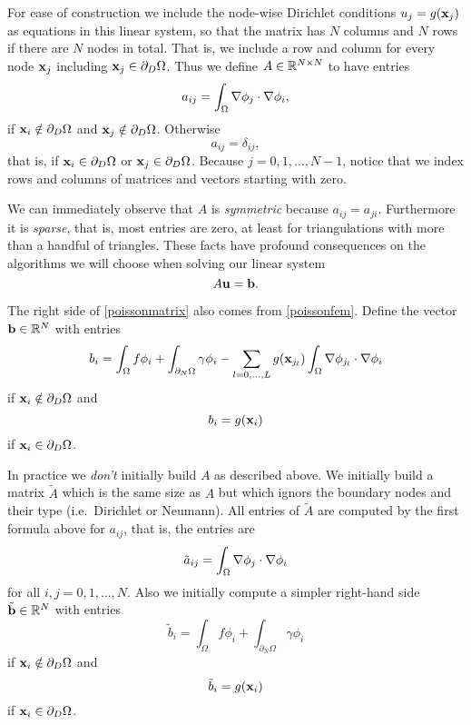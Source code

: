 For ease of construction we include the node-wise Dirichlet conditions $u_j=g(\mathbf{x}_j)$ as equations in this linear system, so that the matrix has $N$ columns and $N$ rows if there are $N$ nodes in total.  That is, we include a row and column for every node $\mathbf{x}_j$ including $\mathbf{x}_j\in\partial_D\Omega$.  Thus we define $A \in \mathbb{R}^{N\times N}$ to have entries
\begin{equation*}
a_{ij} = \int_\Omega \nabla \phi_j \cdot \nabla \phi_i,
\end{equation*}
if $\mathbf{x}_i \notin \partial_D \Omega$ and $\mathbf{x}_j \notin \partial_D \Omega$.  Otherwise
\begin{equation*}
a_{ij} = \delta_{ij},
\end{equation*}
that is, if $\mathbf{x}_i \in \partial_D \Omega$ or $\mathbf{x}_j \in \partial_D \Omega$.  Because $j=0,1,\dots,N-1$, notice that we index rows and columns of matrices and vectors starting with zero.

We can immediately observe that $A$ is \emph{symmetric} because $a_{ij}=a_{ji}$.  Furthermore it is \emph{sparse}, that is, most entries are zero, at least for triangulations with more than a handful of triangles.  These facts have profound consequences on the algorithms we will choose when solving our linear system
\begin{equation}
A \mathbf{u} = \mathbf{b}. \label{poissonmatrix}
\end{equation}

The right side of \eqref{poissonmatrix} also comes from \eqref{poissonfem}.  Define the vector $\mathbf{b}\in\mathbb{R}^N$ with entries
    $$b_i = \int_\Omega f \phi_i + \int_{\partial_N\Omega} \gamma \phi_i - \sum_{l=0,\dots,L} g(\mathbf{x}_{j_l})  \int_\Omega \nabla \phi_{j_l} \cdot \nabla \phi_i$$
if $\mathbf{x}_i \notin \partial_D \Omega$ and
    $$b_i = g(\mathbf{x}_{i})$$
if $\mathbf{x}_i \in \partial_D \Omega$.

In practice we \emph{don't} initially build $A$ as described above.  We initially build a matrix $\tilde A$ which is the same size as $A$ but which ignors the boundary nodes and their type (i.e.~Dirichlet or Neumann).  All entries of $\tilde A$ are computed by the first formula above for $a_{ij}$, that is, the entries are
\begin{equation*}
\tilde a_{ij} = \int_\Omega \nabla \phi_j \cdot \nabla \phi_i
\end{equation*}
for all $i,j=0,1,\dots,N$.  Also we initially compute a simpler right-hand side $\tilde {\mathbf{b}}\in\mathbb{R}^N$ with entries
    $$\tilde b_i = \int_\Omega f \phi_i + \int_{\partial_N\Omega} \gamma \phi_i$$
if $\mathbf{x}_i \notin \partial_D \Omega$ and
    $$\tilde b_i = g(\mathbf{x}_{i})$$
if $\mathbf{x}_i \in \partial_D \Omega$.

